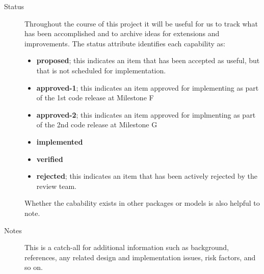 \begin{description}
\item [Status] Throughout the course of this project it will be 
useful for us to track what has been accomplished and to archive 
ideas for extensions and improvements.  The status attribute identifies
each capability as:
\begin{itemize}
\item {\bf proposed}; this indicates an item that has been accepted as useful, but
that is not scheduled for implementation.
\item {\bf approved-1}; this indicates an item approved for implementing as part
of the 1st code release at Milestone F
\item {\bf approved-2}; this indicates an item approved for implmenting as part 
of the 2nd code release at Milestone G
\item {\bf implemented}
\item {\bf verified}
\item {\bf rejected}; this indicates an item that has been actively rejected by
the review team.
\end{itemize}
Whether the cabability exists in other packages or models
is also helpful to note.

\item [Notes] This is a catch-all for additional information such
as background, references, any related design and implementation issues, 
risk factors, and so on.

\end{description}

